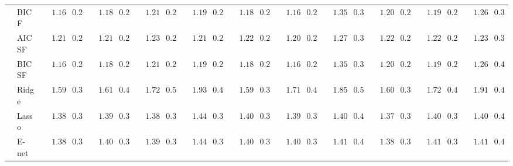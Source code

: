 \begin{tabular}{p{0.2cm}p{1cm}|p{0.6cm}p{0.6cm}|p{0.6cm}p{0.6cm}p{0.6cm}p{0.6cm}p{0.6cm}p{0.6cm}|p{0.6cm}p{0.6cm}p{0.6cm}p{0.6cm}p{0.6cm}p{0.6cm}|p{0.6cm}p{0.6cm}p{0.6cm}p{0.6cm}p{0.6cm}p{0.6cm}}
 & BIC F  & $\phantom{00}1.16$ & $\phantom{0}0.25$ & $\phantom{00}1.18$ & $\phantom{0}0.24$ & $\phantom{00}1.21$ & $\phantom{0}0.27$ & $\phantom{00}1.19$ & $\phantom{0}0.27$ & $\phantom{00}1.18$ & $\phantom{0}0.27$ & $\phantom{00}1.16$ & $\phantom{0}0.23$ & $\phantom{00}1.35$ & $\phantom{0}0.38$ & $\phantom{00}1.20$ & $\phantom{0}0.28$ & $\phantom{00}1.19$ & $\phantom{0}0.25$ & $\phantom{00}1.26$ & $\phantom{0}0.39$ \\
 & AIC SF  & $\phantom{00}1.21$ & $\phantom{0}0.25$ & $\phantom{00}1.21$ & $\phantom{0}0.25$ & $\phantom{00}1.23$ & $\phantom{0}0.26$ & $\phantom{00}1.21$ & $\phantom{0}0.25$ & $\phantom{00}1.22$ & $\phantom{0}0.27$ & $\phantom{00}1.20$ & $\phantom{0}0.25$ & $\phantom{00}1.27$ & $\phantom{0}0.30$ & $\phantom{00}1.22$ & $\phantom{0}0.26$ & $\phantom{00}1.22$ & $\phantom{0}0.25$ & $\phantom{00}1.23$ & $\phantom{0}0.31$ \\
 & BIC SF  & $\phantom{00}1.16$ & $\phantom{0}0.25$ & $\phantom{00}1.18$ & $\phantom{0}0.24$ & $\phantom{00}1.21$ & $\phantom{0}0.27$ & $\phantom{00}1.19$ & $\phantom{0}0.27$ & $\phantom{00}1.18$ & $\phantom{0}0.27$ & $\phantom{00}1.16$ & $\phantom{0}0.23$ & $\phantom{00}1.35$ & $\phantom{0}0.38$ & $\phantom{00}1.20$ & $\phantom{0}0.28$ & $\phantom{00}1.19$ & $\phantom{0}0.25$ & $\phantom{00}1.26$ & $\phantom{0}0.40$ \\
 & Ridge  & $\phantom{00}1.59$ & $\phantom{0}0.35$ & $\phantom{00}1.61$ & $\phantom{0}0.41$ & $\phantom{00}1.72$ & $\phantom{0}0.50$ & $\phantom{00}1.93$ & $\phantom{0}0.42$ & $\phantom{00}1.59$ & $\phantom{0}0.37$ & $\phantom{00}1.71$ & $\phantom{0}0.40$ & $\phantom{00}1.85$ & $\phantom{0}0.52$ & $\phantom{00}1.60$ & $\phantom{0}0.38$ & $\phantom{00}1.72$ & $\phantom{0}0.46$ & $\phantom{00}1.91$ & $\phantom{0}0.48$ \\
 & Lasso  & $\phantom{00}1.38$ & $\phantom{0}0.33$ & $\phantom{00}1.39$ & $\phantom{0}0.36$ & $\phantom{00}1.38$ & $\phantom{0}0.39$ & $\phantom{00}1.44$ & $\phantom{0}0.36$ & $\phantom{00}1.40$ & $\phantom{0}0.33$ & $\phantom{00}1.39$ & $\phantom{0}0.33$ & $\phantom{00}1.40$ & $\phantom{0}0.44$ & $\phantom{00}1.37$ & $\phantom{0}0.36$ & $\phantom{00}1.40$ & $\phantom{0}0.38$ & $\phantom{00}1.40$ & $\phantom{0}0.40$ \\
 & E-net  & $\phantom{00}1.38$ & $\phantom{0}0.33$ & $\phantom{00}1.40$ & $\phantom{0}0.36$ & $\phantom{00}1.39$ & $\phantom{0}0.39$ & $\phantom{00}1.44$ & $\phantom{0}0.35$ & $\phantom{00}1.40$ & $\phantom{0}0.33$ & $\phantom{00}1.40$ & $\phantom{0}0.32$ & $\phantom{00}1.41$ & $\phantom{0}0.44$ & $\phantom{00}1.38$ & $\phantom{0}0.37$ & $\phantom{00}1.41$ & $\phantom{0}0.39$ & $\phantom{00}1.41$ & $\phantom{0}0.40$ \\

\end{tabular}
